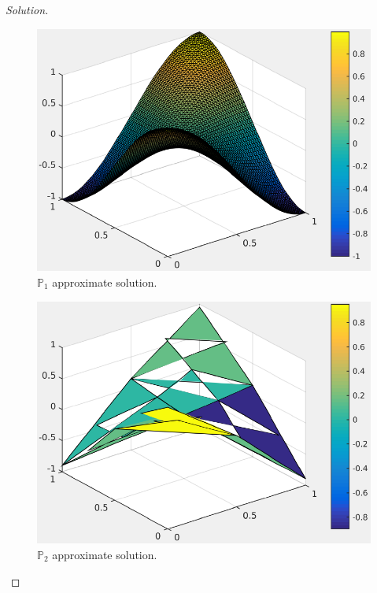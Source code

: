 \documentclass[11pt,a4paper,center,notitlepage]{article}
\numberwithin{equation}{section}
\begin{document}
\begin{proof}[Solution]
\begin{figure}[H]
\centering
\includegraphics[scale=0.9]{appro_solution_6_P1}
\caption{$\mathbb{P}_1$ approximate solution.}
\end{figure} 

\begin{figure}[H]
\centering
\includegraphics[scale=0.9]{appro_solution_1_P2}
\caption{$\mathbb{P}_2$ approximate solution.}
\end{figure} 


\end{proof}
\end{document}
